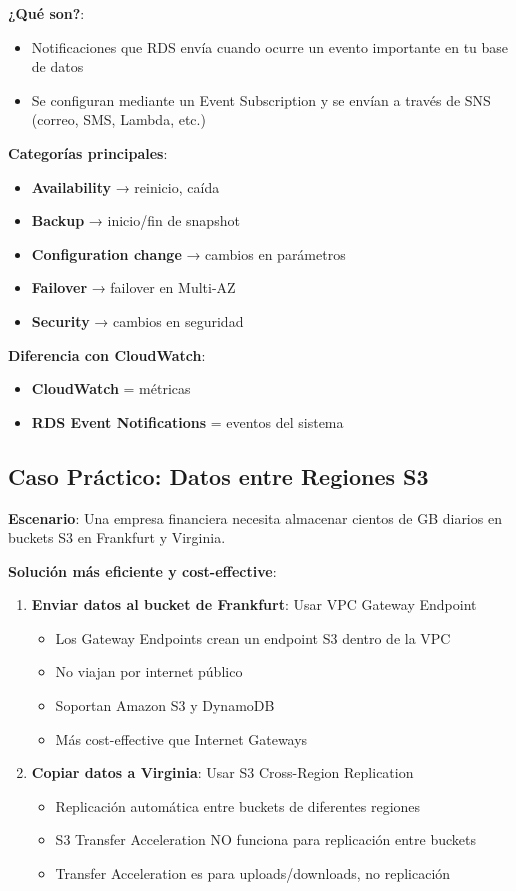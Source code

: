 \documentclass[12pt,a4paper]{report}
\begin{document}
\textbf{¿Qué son?}:
\begin{itemize}
    \item Notificaciones que RDS envía cuando ocurre un evento importante en tu base de datos
    \item Se configuran mediante un Event Subscription y se envían a través de SNS (correo, SMS, Lambda, etc.)
\end{itemize}

\textbf{Categorías principales}:
\begin{itemize}
    \item \textbf{Availability} → reinicio, caída
    \item \textbf{Backup} → inicio/fin de snapshot
    \item \textbf{Configuration change} → cambios en parámetros
    \item \textbf{Failover} → failover en Multi-AZ
    \item \textbf{Security} → cambios en seguridad
\end{itemize}

\textbf{Diferencia con CloudWatch}:
\begin{itemize}
    \item \textbf{CloudWatch} = métricas
    \item \textbf{RDS Event Notifications} = eventos del sistema
\end{itemize}

\subsection{Caso Práctico: Datos entre Regiones S3}

\textbf{Escenario}: Una empresa financiera necesita almacenar cientos de GB diarios en buckets S3 en Frankfurt y Virginia.

\textbf{Solución más eficiente y cost-effective}:

\begin{enumerate}
    \item \textbf{Enviar datos al bucket de Frankfurt}: Usar VPC Gateway Endpoint
    \begin{itemize}
        \item Los Gateway Endpoints crean un endpoint S3 dentro de la VPC
        \item No viajan por internet público
        \item Soportan Amazon S3 y DynamoDB
        \item Más cost-effective que Internet Gateways
    \end{itemize}
    
    \item \textbf{Copiar datos a Virginia}: Usar S3 Cross-Region Replication
    \begin{itemize}
        \item Replicación automática entre buckets de diferentes regiones
        \item S3 Transfer Acceleration NO funciona para replicación entre buckets
        \item Transfer Acceleration es para uploads/downloads, no replicación
    \end{itemize}
\end{enumerate}
\end{document}
